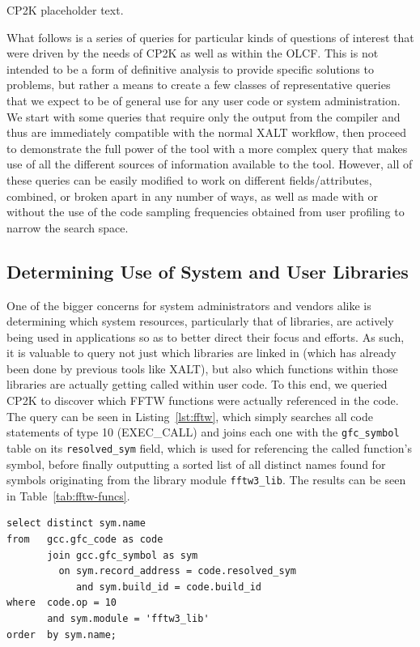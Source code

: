 CP2K placeholder text.

What follows is a series of queries for particular kinds of questions of interest that were driven by the needs of CP2K as well as within the \acs{OLCF}.
This is not intended to be a form of definitive analysis to provide specific solutions to problems, but rather a means to create a few classes of representative queries that we expect to be of general use for any user code or system administration.
We start with some queries that require only the output from the compiler and thus are immediately compatible with the normal XALT workflow, then proceed to demonstrate the full power of the tool with a more complex query that makes use of all the different sources of information available to the tool.
However, all of these queries can be easily modified to work on different fields/attributes, combined, or broken apart in any number of ways, as well as made with or without the use of the code sampling frequencies obtained from user profiling to narrow the search space.

\subsection{Determining Use of System and User Libraries}
One of the bigger concerns for system administrators and vendors alike is determining which system resources, particularly that of libraries, are actively being used in applications so as to better direct their focus and efforts.
As such, it is valuable to query not just which libraries are linked in (which has already been done by previous tools like XALT), but also which functions within those libraries are actually getting called within user code.
To this end, we queried CP2K to discover which \ac{FFTW} functions were actually referenced in the code.
The query can be seen in Listing~\ref{lst:fftw}, which simply searches all code statements of type 10 (EXEC\_CALL) and joins each one with the \texttt{gfc\_symbol} table on its \texttt{resolved\_sym} field, which is used for referencing the called function's symbol, before finally outputting a sorted list of all distinct names found for symbols originating from the library module \texttt{fftw3\_lib}.
The results can be seen in Table~\ref{tab:fftw-funcs}.

\begin{lstlisting}[caption=foo, label=lst:fftw]
select distinct sym.name
from   gcc.gfc_code as code
       join gcc.gfc_symbol as sym
         on sym.record_address = code.resolved_sym
            and sym.build_id = code.build_id
where  code.op = 10
       and sym.module = 'fftw3_lib'
order  by sym.name;
\end{lstlisting}

